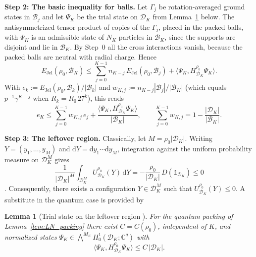\documentclass[final,reqno]{amsart}
\newtheorem{lemma}[theorem]{Lemma}
\theoremstyle{remark}
\theoremstyle{definition}
\renewcommand{\le}{\leqslant}
\newcommand{\CC}{\mathbb{C}}
\newcommand{\iden}{\mathbb{1}}
\newcommand{\Jel}{\mathrm{Jel}}
\begin{document}
\noindent\textbf{Step 2: The basic inequality for balls.} Let $\Gamma_j$ be rotation-averaged ground states in $\mathcal B_j$ and let $\Psi_K$ be the trial state on $\mathcal D_K$ from Lemma~\ref{lem:LN_trial} below. The antisymmetrized tensor product of copies of the $\Gamma_j$, placed in the packed balls, with $\Psi_K$ is an admissible state of $N_K$ particles in $\mathcal B_K$, since the supports are disjoint and lie in $\mathcal B_K$. By Step~0 all the cross interactions vanish, because the packed balls are neutral with radial charge. Hence
\[
E_\Jel(\rho_0,\mathcal B_K)\le\sum_{j=0}^{K-1}n_{K-j}\,E_\Jel(\rho_0,\mathcal B_j)+\big\langle\Psi_K,H^{\rho_0}_{\mathcal D_K}\Psi_K\big\rangle.
\]
With $e_k:=E_\Jel(\rho_0,\mathcal B_k)/|\mathcal B_k|$ and $w_{K,j}:=n_{K-j}|\mathcal B_j|/|\mathcal B_K|$ (which equals $p^{-1}\gamma^{K-j}$ when $R_k=R_0\,27^k$), this reads
\begin{equation}\label{eq:LN_recursion}
e_K\le\sum_{j=0}^{K-1}w_{K,j}\,e_j+\frac{\langle\Psi_K,H^{\rho_0}_{\mathcal D_K}\Psi_K\rangle}{|\mathcal B_K|},\qquad\sum_{j=0}^{K-1}w_{K,j}=1-\frac{|\mathcal D_K|}{|\mathcal B_K|}.
\end{equation}

\noindent\textbf{Step 3: The leftover region.} Classically, let $M=\rho_0|\mathcal D_K|$. Writing $Y=(y_1,\ldots,y_M)$ and $\mathrm dY=\mathrm dy_1\cdots\mathrm dy_M$, integration against the uniform probability measure on $\mathcal D_K^M$ gives
\[
\frac1{|\mathcal D_K|^M}\int_{\mathcal D_K^M}U^{\rho_0}_{\mathcal D_K}(Y)\,\mathrm dY
=-\frac{\rho_0}{|\mathcal D_K|}\,D(\iden_{\mathcal D_K})\le0
\]
\cite[Eq.~(11)]{lieb1975thermodynamic}. Consequently, there exists a configuration $Y\in\mathcal D_K^M$ such that $U^{\rho_0}_{\mathcal D_K}(Y)\le0$. A substitute in the quantum case is provided by
\begin{lemma}[Trial state on the leftover region {\cite[Sec.~5.1]{lieb1975thermodynamic}}]\label{lem:LN_trial}
For the quantum packing of Lemma~\ref{lem:LN_packing} there exist $C=C(\rho_0)$, independent of $K$, and normalized states $\Psi_K\in\bigwedge^{M_K}H^1_0(\mathcal D_K;\CC^q)$ with
\[
\big\langle\Psi_K,H^{\rho_0}_{\mathcal D_K}\Psi_K\big\rangle\le C\,|\mathcal D_K|.
\]
\end{lemma}
\end{document}
